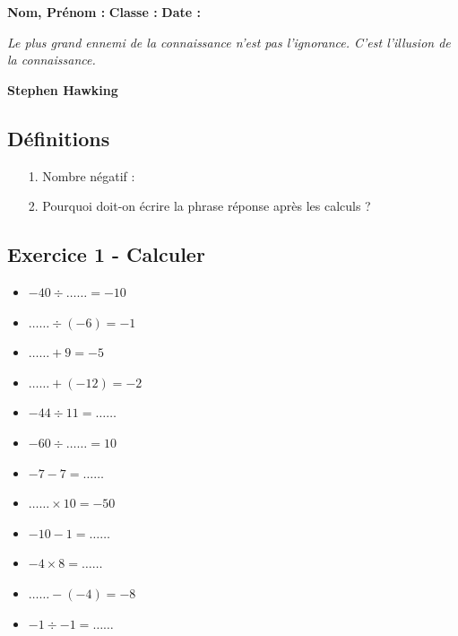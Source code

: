 



\textbf{Nom, Prénom :} \hspace{8cm} \textbf{Classe :} \hspace{3cm} \textbf{Date :}\\

\begin{center}
  \textit{Le plus grand ennemi de la connaissance n'est pas l'ignorance. C'est l'illusion de la connaissance.} 
  
  \textbf{Stephen Hawking}
\end{center}


\subsection*{Définitions}
  \begin{enumerate}
    \item[1.] Nombre négatif : \dotfill \\
    \Pointilles[1]
    \item[2.] Pourquoi doit-on écrire la phrase réponse après les calculs ?  \dotfill \\
    \Pointilles[2]
  \end{enumerate}

\subsection*{Exercice 1 - Calculer}

\begin{multicols}{3}\noindent
  \begin{itemize}[label={$\bullet$}]
        \item $-40 \div \ldots\ldots = -10$
        \item $\ldots\ldots \div \left( -6\right) = -1$
        \item $\ldots\ldots + 9 = -5$
        \item $\ldots\ldots + \left( - 12\right) = -2$
        \item $-44 \div 11 = \ldots\ldots$
        \item $-60 \div \ldots\ldots = 10$
        \item $-7 - 7 = \ldots\ldots$
        \item $\ldots\ldots \times 10 = -50$
        \item $-10 - 1 = \ldots\ldots$
        \item $-4 \times 8 = \ldots\ldots$
        \item $\ldots\ldots - \left( -4\right) = -8$
        \item $-1 \div -1 = \ldots\ldots$
    \end{itemize}
  \end{multicols}

